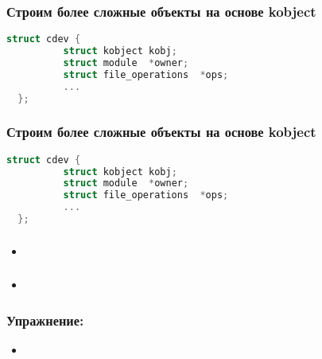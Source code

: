 \begin{frame}[fragile]
  \frametitle{Строим более сложные объекты на основе kobject}
  \begin{lstlisting}[language=C]
  struct cdev { 
          struct kobject kobj; 
          struct module  *owner; 
          struct file_operations  *ops; 
          ...
  };
  \end{lstlisting}
\end{frame}
\begin{frame}[fragile]
  \frametitle{Строим более сложные объекты на основе kobject}
  \begin{lstlisting}[language=C]
  struct cdev { 
          struct kobject kobj; 
          struct module  *owner; 
          struct file_operations  *ops; 
          ...
  };
  \end{lstlisting}
\end{frame}
\begin{frame}
  \frametitle{}
  \begin{itemize}
      \item
  \end{itemize}
\end{frame}
\begin{frame}
  \frametitle{}
  \begin{itemize}
      \item
  \end{itemize}
\end{frame}
\begin{frame}
  \frametitle{Упражнение: }
  \begin{itemize}
      \item 
  \end{itemize}
\end{frame}

